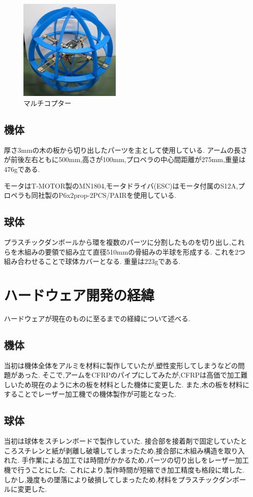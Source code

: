 \documentclass[twocolumn,11pt]{sotsuken_abst}
\begin{document}
\begin{figure}[htbp]
	\begin{center}
		\includegraphics[width=50mm]{image/multicopter.jpg}
		\caption{マルチコプター}
		\label{fig:multicopter}
	\end{center}
\end{figure}

\subsection{機体}
厚さ3mmの木の板から切り出したパーツを主として使用している.
アームの長さが前後左右ともに500mm,高さが100mm,プロペラの中心間距離が275mm,重量は476gである.

モータはT-MOTOR製のMN1804,モータドライバ(ESC)はモータ付属のS12A,プロペラも同社製のP6x2prop-2PCS/PAIRを使用している.

\subsection{球体}
プラスチックダンボールから環を複数のパーツに分割したものを切り出し,これらを木組みの要領で組み立て直径510mmの骨組みの半球を形成する.
これを2つ組み合わせることで球体カバーとなる.
重量は223gである.


\section{ハードウェア開発の経緯}
ハードウェアが現在のものに至るまでの経緯について述べる.

\subsection{機体}
当初は機体全体をアルミを材料に製作していたが,塑性変形してしまうなどの問題があった.
そこで,アームをCFRPのパイプにしてみたが,CFRPは高価で加工難しいため現在のように木の板を材料とした機体に変更した.
また,木の板を材料にすることでレーザー加工機での機体製作が可能となった.

\subsection{球体}
当初は球体をスチレンボードで製作していた.
接合部を接着剤で固定していたところスチレンと紙が剥離し破壊してしまったため,接合部に木組み構造を取り入れた.
手作業による加工では時間がかかるため,パーツの切り出しをレーザー加工機で行うことにした.
これにより,製作時間が短縮でき加工精度も格段に増した.
しかし,幾度もの墜落により破損してしまったため,材料をプラスチックダンボールに変更した.
\end{document}
